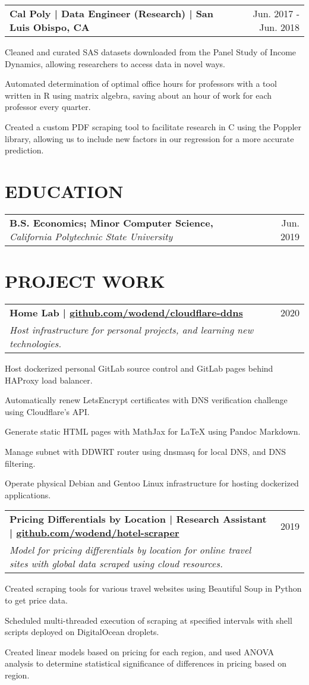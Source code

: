 \documentclass{article}
\makeatletter
\newcommand{\beginResumeList}{\begin{itemize}\setlength\itemsep{0em}\begin{minipage}{0.9\textwidth}}
\newcommand{\resumeListEnd}{\end{minipage}\end{itemize}}
\newcommand{\normalItem}[1]{\normalsize\item{#1}}
\newcommand{\experience}[2]{
  \begin{tabular*}{\textwidth}[t]{l@{\extracolsep{\fill}}r}
    \normalsize\textbf{#1} & \normalsize #2 \\
  \end{tabular*}
}
\newcommand{\education}[3]{
  \begin{tabular*}{\textwidth}[t]{l@{\extracolsep{\fill}}r}
    \normalsize\textbf{#1, }\textit{#2} & \normalsize #3 \\
  \end{tabular*}
}
\newcommand{\project}[3]{
  \begin{tabular*}{\textwidth}[t]{l@{\extracolsep{\fill}}r}
    \normalsize\textbf{#1} & \normalsize #2 \\
    \normalsize\textit{#3}
  \end{tabular*}
}
\makeatother
\begin{document}
  \experience
    {Cal Poly | Data Engineer (Research) | San Luis Obispo, CA}
    {Jun. 2017 - Jun. 2018}
    \beginResumeList
      \normalItem{Cleaned and curated SAS datasets downloaded from the Panel Study of Income Dynamics, allowing researchers to access data in novel ways.}
      \normalItem{Automated determination of optimal office hours for professors with a tool written in R using matrix algebra, saving about an hour of work for each professor every quarter.}
      \normalItem{Created a custom PDF scraping tool to facilitate research in C using the Poppler library, allowing us to include new factors in our regression for a more accurate prediction.}
    \resumeListEnd

\section{EDUCATION}
  \education
    {B.S. Economics; Minor Computer Science}
    {California Polytechnic State University}
    {Jun. 2019}

\section{PROJECT WORK}
  \project
    {Home Lab | \href{https://github.com/wodend/cloudflare-ddns}{github.com/wodend/cloudflare-ddns}}
    {2020}
    {Host infrastructure for personal projects, and learning new technologies.}
    \beginResumeList
      \normalItem{Host dockerized personal GitLab source control and GitLab pages behind HAProxy load balancer.}
      \normalItem{Automatically renew LetsEncrypt certificates with DNS verification challenge using Cloudflare's API.}
      \normalItem{Generate static HTML pages with MathJax for LaTeX using Pandoc Markdown.}
      \normalItem{Manage subnet with DDWRT router using dnsmasq for local DNS, and DNS filtering.}
      \normalItem{Operate physical Debian and Gentoo Linux infrastructure for hosting dockerized applications.}
    \resumeListEnd

  \project
    {Pricing Differentials by Location | Research Assistant | \href{https://github.com/wodend/hotel-scraper}{github.com/wodend/hotel-scraper}}
    {2019}
    {Model for pricing differentials by location for online travel sites with global data scraped using cloud resources.}
    \beginResumeList
      \normalItem{Created scraping tools for various travel websites using Beautiful Soup in Python to get price data.}
      \normalItem{Scheduled multi-threaded execution of scraping at specified intervals with shell scripts deployed on DigitalOcean droplets.}
      \normalItem{Created linear models based on pricing for each region, and used ANOVA analysis to determine statistical significance of differences in pricing based on region.}
    \resumeListEnd
\end{document}
